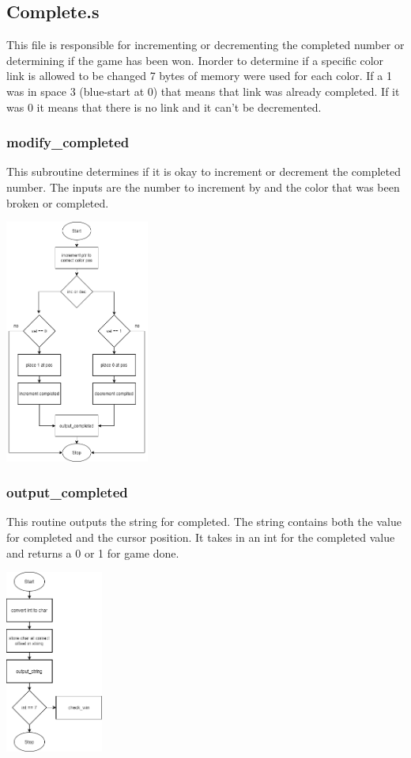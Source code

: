 \documentclass{article}
\begin{document}
\subsection{Complete.s}
    This file is responsible for incrementing or decrementing 
    the completed number or determining if the game has been won.
    Inorder to determine if a specific color link is allowed to 
    be changed 7 bytes of memory were used for each color.  If a 
    1 was in space 3 (blue-start at 0) that means that link was already completed.
    If it was 0 it means that there is no link and it can't be decremented.

    \subsubsection{modify\_completed}
    This subroutine determines if it is okay to increment or decrement 
    the completed number. The inputs are the number to increment by and
    the color that was been broken or completed.

    \begin{center}
        {\includegraphics[height=8cm]{modify_completed.png}\centering} 
    \end{center}
    \newpage

    \subsubsection{output\_completed}
    This routine outputs the string for completed. The string contains both the 
    value for completed and the cursor position. It takes in an int for the 
    completed value and returns a 0 or 1 for game done.
    \begin{center}
        {\includegraphics[height=6cm]{output_completed.png}\centering} 
    \end{center}
\end{document}
